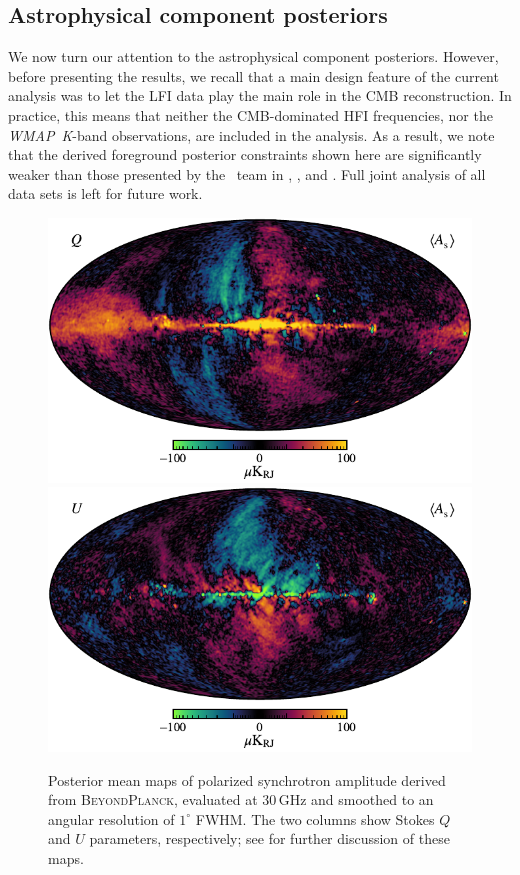 \documentclass[twocolumn]{aa}
\def\WMAP{\emph{WMAP}}
\newcommand{\BP}{\textsc{BeyondPlanck}}
\begin{document}
\subsection{Astrophysical component posteriors}
\label{sec:sky_params}

We now turn our attention to the astrophysical component posteriors. However,
before presenting the results, we recall that a main design feature of the
current analysis was to let the LFI data play the main role in the CMB
reconstruction. In practice, this means that neither the CMB-dominated HFI
frequencies, nor the \WMAP\ \emph K-band observations, are included in the
analysis. As a result, we note that the derived foreground posterior constraints
shown here are significantly weaker than those presented by the \Planck\ team in
\citet{planck2014-a12}, \citet{planck2016-l04}, and \citet{planck2020-LVII}. Full joint
analysis of all data sets is left for future work.

\begin{figure}[t]
  \center
  \includegraphics[width=0.49\linewidth]{figs/BP_synch_v2_Q_MEAN_w12_n1024_cb_c-wildfire.pdf}
  \includegraphics[width=0.49\linewidth]{figs/BP_synch_v2_U_MEAN_w12_n1024_cb_c-wildfire.pdf}
  \caption{Posterior mean maps of polarized synchrotron amplitude derived from \BP,
    evaluated at 30\,GHz and smoothed to an angular resolution of $1^{\circ}$ FWHM. The two columns show Stokes $Q$ and $U$ parameters, respectively; see \citet{bp14} for further discussion of these maps.}\label{fig:synch_pol}
\end{figure}
\end{document}
